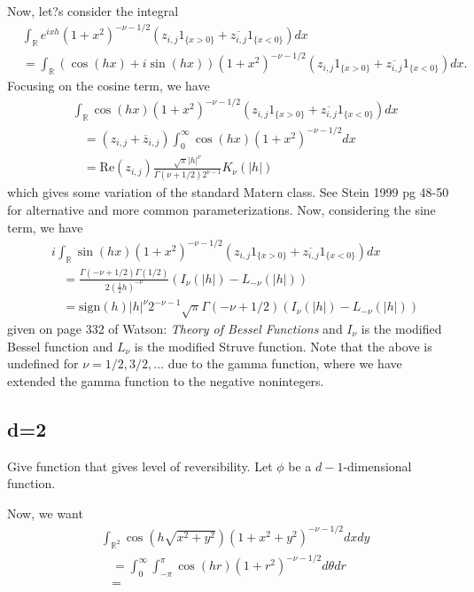\documentclass[11pt]{article}
\begin{document}
Now, let?s consider the integral \begin{align*}
&\int_{\mathbb{R}} e^{ixh} \left(1 + x^2\right)^{-\nu - 1/2} (z_{i,j} 1_{\{x > 0\}} + \overline{z_{i,j}} 1_{\{x < 0\}}) dx \\
&=\int_\mathbb{R} (\cos(hx) + i \sin(hx))\left(1 + x^2\right)^{-\nu - 1/2} (z_{i,j} 1_{\{x > 0\}} + \overline{z_{i,j}} 1_{\{x < 0\}}) dx.
\end{align*}
Focusing on the cosine term, we have \begin{align*}
& \int_\mathbb{R} \cos(hx) \left(1 +x^2\right)^{-\nu - 1/2} (z_{i,j} 1_{\{x > 0\}} + \overline{z_{i,j}} 1_{\{x < 0\}}) dx \\
&\ \ \ \ =(z_{i,j} + \overline{z}_{i,j}) \int_0^\infty \cos(hx) \left(1 + x^2\right)^{-\nu - 1/2} dx  \\
&\ \ \ \ =\textrm{Re}(z_{i,j}) \frac{\sqrt{\pi} |h|^\nu}{\Gamma(\nu + 1/2) 2^{\nu-1}} K_\nu(|h|)
\end{align*}which gives some variation of the standard Matern class. See Stein 1999 pg 48-50 for alternative and more common parameterizations. Now, considering the sine term, we have \begin{align*}
& i\int_\mathbb{R} \sin(hx)\left(1 + x^2\right)^{-\nu - 1/2} (z_{i,j} 1_{\{x > 0\}} + \overline{z_{i,j}} 1_{\{x < 0\}}) dx \\
& \ \ \ \ = \frac{\Gamma(-\nu + 1/2) \Gamma(1/2)}{2 (\frac{1}{2}h)^{-\nu}}\left(I_{\nu}(|h|) - L_{-\nu} (|h|)\right)\\
& \ \ \ \ = \textrm{sign}(h) |h|^{\nu} 2^{-\nu-1} \sqrt{\pi} \Gamma(-\nu + 1/2)\left(I_{\nu}(|h|) - L_{-\nu} (|h|)\right)
\end{align*}given on page 332 of Watson: \textit{Theory of Bessel Functions} and $I_\nu$ is the modified Bessel function and $L_\nu$ is the modified Struve function. Note that the above is undefined for $\nu = 1/2, 3/2, \dots$ due to the gamma function, where we have extended the gamma function to the negative nonintegers. 

\subsection{d=2}

Give function that gives level of reversibility. Let $\phi$ be a $d-1$-dimensional function.

Now, we want \begin{align*}
&\int_{\mathbb{R}^2} \cos(h\sqrt{x^2 + y^2}) (1 + x^2+ y^2)^{-\nu - 1/2} dxdy \\
& \ \ \ \ =\int_0^\infty \int_{-\pi}^\pi \cos(hr)
 (1 + r^2)^{-\nu-1/2} d\theta dr \\
 & \ \ \ \ = 
  \end{align*}
\end{document}

